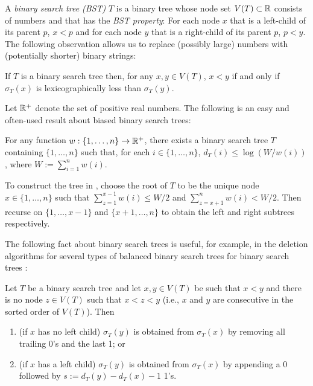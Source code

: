 \documentclass[kpfonts]{patmorin}
\begin{document}
A \emph{binary search tree (BST)} $T$ is a binary tree  whose node set $V(T)\subset\mathbb{R}$ consists of numbers and that has the \emph{BST property}:  For each node $x$ that is a left-child of its parent $p$, $x<p$ and for each node $y$ that is a right-child of its parent $p$, $p<y$.  The following observation allows us to replace (possibly large) numbers with (potentially shorter) binary strings:

\begin{obs}
  If $T$ is a binary search tree then, for any $x,y\in V(T)$, $x<y$ if and only if $\sigma_T(x)$ is lexicographically less than $\sigma_T(y)$.
\end{obs}

Let $\mathbb{R}^+$ denote the set of positive real numbers. The following is an easy and often-used result about biased binary search trees:

\begin{lem}
  For any function $w:\{1,\ldots,n\}\to\mathbb{R}^+$, there exists a binary search tree $T$ containing $\{1,\ldots,n\}$ such that, for each $i\in\{1,\ldots,n\}$, $d_T(i)\le\log(W/w(i))$, where $W:=\sum_{i=1}^n w(i)$.
\end{lem}

To construct the tree in , choose the root of $T$ to be the unique node $x\in\{1,\ldots,n\}$ such that $\sum_{z=1}^{x-1} w(i)\le W/2$ and $\sum_{z=x+1}^{n} w(i)< W/2$.  Then recurse on $\{1,\ldots,x-1\}$ and $\{x+1,\ldots,n\}$ to obtain the left and right subtrees respectively.

The following fact about binary search trees is useful, for example, in the deletion algorithms for several types of balanced binary search trees for binary search trees \cite[Section~6.2.3]{morin:open}:

\begin{lem}
  Let $T$ be a binary search tree and let $x,y\in V(T)$ be such that $x<y$ and there is no node $z\in V(T)$ such that $x<z<y$ (i.e., $x$ and $y$ are consecutive in the sorted order of $V(T)$).  Then
  \begin{enumerate}
    \item (if $x$ has no left child) $\sigma_T(y)$ is obtained from $\sigma_T(x)$ by removing all trailing 0's and the last 1; or
    \item (if $x$ has a left child) $\sigma_T(y)$ is obtained from $\sigma_T(x)$ by appending a 0 followed by $s:=d_T(y)-d_T(x)-1$ 1's.
  \end{enumerate}
\end{lem}
\end{document}
